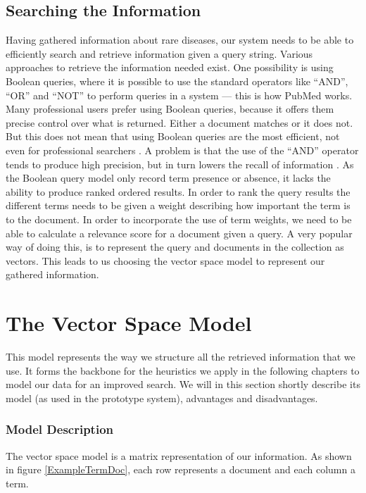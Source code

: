 \subsection{Searching the Information}
Having gathered information about rare diseases, our system needs to
be able to efficiently search and retrieve information given a query
string. Various approaches to retrieve the information needed
exist. One possibility is using Boolean queries, where it is possible
to use the standard operators like ``AND'', ``OR'' and ``NOT'' to
perform queries in a system --- this is how PubMed works. Many
professional users prefer using Boolean queries, because it offers
them precise control over what is returned. Either a document matches
or it does not. But this does not mean that using Boolean queries are
the most efficient, not even for professional searchers
\cite{IntroIR2009}. A problem is that the use of the ``AND'' operator
tends to produce high precision, but in turn lowers the recall of
information \cite{IntroIR2009}. As the Boolean query model only record
term presence or absence, it lacks the ability to produce ranked
ordered results. In order to rank the query results the different
terms needs to be given a weight describing how important the term is
to the document. In order to incorporate the use of term weights, we
need to be able to calculate a relevance score for a document given a
query. A very popular way of doing this, is to represent the query and
documents in the collection as vectors. This leads to us choosing the
vector space model to represent our gathered information.

\section{The Vector Space Model\label{VectorSpace}}

This model represents the way we structure all the retrieved
information that we use. It forms the backbone for the heuristics we
apply in the following chapters to model our data for an improved
search. We will in this section shortly describe its model (as used in
the prototype system), advantages and disadvantages.

\subsubsection{Model Description}
The vector space model is a matrix representation of our
information. As shown in figure \ref{ExampleTermDoc}, each row represents a
document and each column a term.

